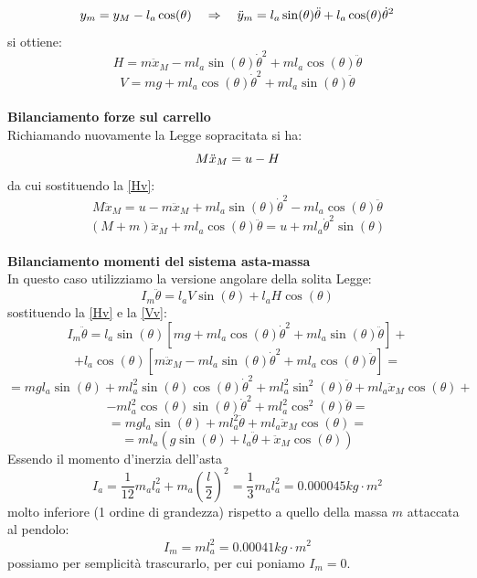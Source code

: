 \begin{equation}\notag
y_m=y_M-l_a\cos(\theta) \quad \Rightarrow \quad \ddot{y}_m=l_a\sin(\theta)\ddot{\theta}+l_a\cos(\theta)\dot{\theta}^2
\end{equation}
si ottiene:
\begin{equation}\label{Hv}
H=m\ddot{x}_M-ml_a\sin(\theta)\dot{\theta}^2+ml_a\cos(\theta)\ddot{\theta}
\end{equation}
\begin{equation}\label{Vv}
V=mg+ml_a\cos(\theta)\dot{\theta}^2+ml_a\sin(\theta)\ddot{\theta}
\end{equation}\\
\textbf{Bilanciamento forze sul carrello}\\
Richiamando nuovamente la Legge sopracitata si ha:
\begin{equation}\notag
M\ddot{x}_M=u-H
\end{equation}
da cui sostituendo la \ref{Hv}:
$$
M\ddot{x}_M=u-m\ddot{x}_M+ml_a\sin(\theta)\dot{\theta}^2-ml_a\cos(\theta)\ddot{\theta}
$$
\begin{equation}\label{FCarr}
(M+m)\ddot{x}_M+ml_a\cos(\theta)\ddot{\theta}=u+ml_a\dot{\theta}^2\sin(\theta)
\end{equation}\\
\textbf{Bilanciamento momenti del sistema asta-massa}\\
In questo caso utilizziamo la versione angolare della solita Legge:
\begin{equation}
I_m\ddot{\theta}=l_aV\sin(\theta)+l_aH\cos(\theta)
\end{equation}
sostituendo la \ref{Hv} e la \ref{Vv}:
$$
I_m\ddot{\theta}=l_a\sin(\theta)[mg+ml_a\cos(\theta)\dot{\theta}^2+ml_a\sin(\theta)\ddot{\theta}]+$$$$+l_a\cos(\theta)[m\ddot{x}_M-ml_a\sin(\theta)\dot{\theta}^2+ml_a\cos(\theta)\ddot{\theta}]=
$$
$$
=mgl_a\sin(\theta)+ml_a^2\sin(\theta)\cos(\theta)\dot{\theta}^2+ml_a^2\sin^2(\theta)\ddot{\theta}+ml_a\ddot{x}_M\cos(\theta)+$$$$-ml_a^2\cos(\theta)\sin(\theta)\dot{\theta}^2
+ml_a^2\cos^2(\theta)\ddot{\theta}=$$
$$=mgl_a\sin(\theta)+ml_a^2\ddot{\theta}+ml_a\ddot{x}_M\cos(\theta) =
$$
\begin{equation} \label{momInThetaP}
=ml_a(g\sin(\theta)+l_a\ddot{\theta}+\ddot{x}_M\cos(\theta))
\end{equation}
Essendo il momento d'inerzia dell'asta $$
I_a=\displaystyle\frac{1}{12}m_al_a^2+m_a(\displaystyle\frac{l}{2})^2=\displaystyle\frac{1}{3}m_al_a^2=0.000045kg\cdot m^2$$molto inferiore (1 ordine di grandezza) rispetto a quello della massa $m$ attaccata al pendolo: $$
I_m=ml_a^2=0.00041kg\cdot m^2$$ possiamo per semplicità trascurarlo, per cui poniamo $I_m=0$.

